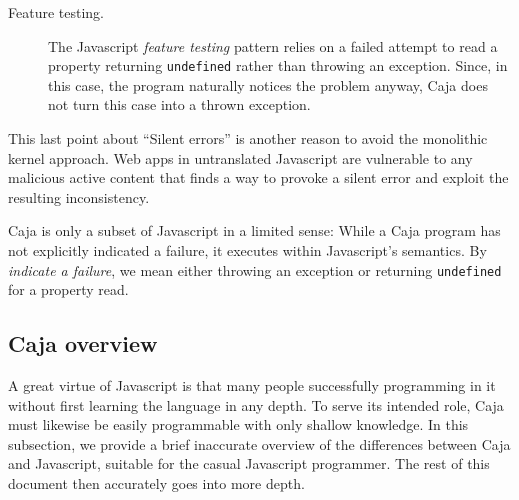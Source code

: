 \documentclass[letterpaper,twocolumn,10pt]{article}
\newcommand{\code}[1]{{\tt {#1}}}              %
\begin{document}
\begin{description}
  \item[Feature testing.] The Javascript \emph{feature testing} pattern 
  relies on a failed attempt to read a property returning \code{undefined} 
  rather than throwing an exception. Since, in this case, the program 
  naturally notices the problem anyway, Caja does not turn this case into a 
  thrown exception.
    
\end{description}

This last point about ``Silent errors'' is another reason to avoid the 
monolithic kernel approach. Web apps in untranslated Javascript are 
vulnerable to any malicious active content that finds a way to provoke a 
silent error and exploit the resulting inconsistency.

Caja is only a subset of Javascript in a limited sense: While a Caja program 
has not explicitly indicated a failure, it executes within Javascript's 
semantics. By \emph{indicate a failure}, we mean either throwing an exception 
or returning \code{undefined} for a property read. 

\subsection{Caja overview}

A great virtue of Javascript is that many people successfully programming in 
it without first learning the language in any depth. To serve its intended 
role, Caja must likewise be easily programmable with only shallow knowledge. 
In this subsection, we provide a brief inaccurate overview of the differences 
between Caja and Javascript, suitable for the casual Javascript programmer. 
The rest of this document then accurately goes into more depth.
\end{document}
